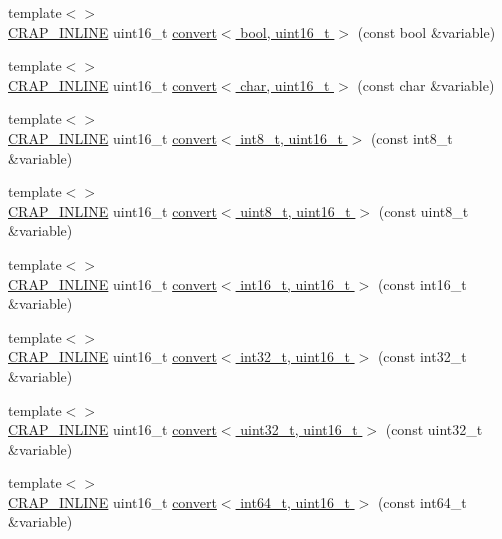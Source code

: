 \begin{DoxyCompactItemize}
\item 
{\footnotesize template$<$$>$ }\\\hyperlink{config__x86_8h_a5a40526b8d842e7ff731509998bb0f1c}{C\+R\+A\+P\+\_\+\+I\+N\+L\+I\+N\+E} uint16\+\_\+t \hyperlink{namespacecrap_a781120aa4294dbb8d3bae62323f510e0}{convert$<$ bool, uint16\+\_\+t $>$} (const bool \&variable)
\item 
{\footnotesize template$<$$>$ }\\\hyperlink{config__x86_8h_a5a40526b8d842e7ff731509998bb0f1c}{C\+R\+A\+P\+\_\+\+I\+N\+L\+I\+N\+E} uint16\+\_\+t \hyperlink{namespacecrap_a0b54061f73e4522f3078723312110027}{convert$<$ char, uint16\+\_\+t $>$} (const char \&variable)
\item 
{\footnotesize template$<$$>$ }\\\hyperlink{config__x86_8h_a5a40526b8d842e7ff731509998bb0f1c}{C\+R\+A\+P\+\_\+\+I\+N\+L\+I\+N\+E} uint16\+\_\+t \hyperlink{namespacecrap_a57a79d60b4394c744fd152b23f89c1f0}{convert$<$ int8\+\_\+t, uint16\+\_\+t $>$} (const int8\+\_\+t \&variable)
\item 
{\footnotesize template$<$$>$ }\\\hyperlink{config__x86_8h_a5a40526b8d842e7ff731509998bb0f1c}{C\+R\+A\+P\+\_\+\+I\+N\+L\+I\+N\+E} uint16\+\_\+t \hyperlink{namespacecrap_acdffcf565cf59f4059ec1b72844da223}{convert$<$ uint8\+\_\+t, uint16\+\_\+t $>$} (const uint8\+\_\+t \&variable)
\item 
{\footnotesize template$<$$>$ }\\\hyperlink{config__x86_8h_a5a40526b8d842e7ff731509998bb0f1c}{C\+R\+A\+P\+\_\+\+I\+N\+L\+I\+N\+E} uint16\+\_\+t \hyperlink{namespacecrap_a73d8bd062bf34ce1027dde7ef1e7a8c6}{convert$<$ int16\+\_\+t, uint16\+\_\+t $>$} (const int16\+\_\+t \&variable)
\item 
{\footnotesize template$<$$>$ }\\\hyperlink{config__x86_8h_a5a40526b8d842e7ff731509998bb0f1c}{C\+R\+A\+P\+\_\+\+I\+N\+L\+I\+N\+E} uint16\+\_\+t \hyperlink{namespacecrap_ab0c5e4fcb0103590493bdf74633c99b4}{convert$<$ int32\+\_\+t, uint16\+\_\+t $>$} (const int32\+\_\+t \&variable)
\item 
{\footnotesize template$<$$>$ }\\\hyperlink{config__x86_8h_a5a40526b8d842e7ff731509998bb0f1c}{C\+R\+A\+P\+\_\+\+I\+N\+L\+I\+N\+E} uint16\+\_\+t \hyperlink{namespacecrap_a2c124aff19ec54020d9f90295ce56b55}{convert$<$ uint32\+\_\+t, uint16\+\_\+t $>$} (const uint32\+\_\+t \&variable)
\item 
{\footnotesize template$<$$>$ }\\\hyperlink{config__x86_8h_a5a40526b8d842e7ff731509998bb0f1c}{C\+R\+A\+P\+\_\+\+I\+N\+L\+I\+N\+E} uint16\+\_\+t \hyperlink{namespacecrap_a508dd2b9a4e2635d78d9ea03b7625169}{convert$<$ int64\+\_\+t, uint16\+\_\+t $>$} (const int64\+\_\+t \&variable)

\end{DoxyCompactItemize}
